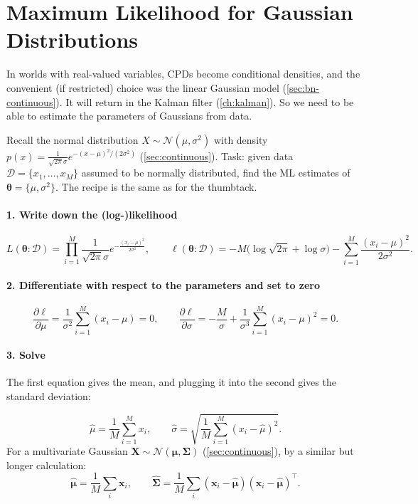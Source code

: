 \documentclass[11pt, oneside]{book}
\newcommand{\dataset}{\mathcal{D}}       %
\newcommand{\params}{\boldsymbol{\theta}}   %
\newcommand{\Normal}{\mathcal{N}}
\newcommand{\bX}{\mathbf{X}}  \newcommand{\bY}{\mathbf{Y}}
\newcommand{\bx}{\mathbf{x}}  \newcommand{\by}{\mathbf{y}}
\let\originalsection\section
\renewcommand{\section}{\Needspace{7\baselineskip}\originalsection}
\begin{document}
\section{Maximum Likelihood for Gaussian Distributions}
\label{sec:ml-gaussian}

In worlds with real-valued variables, CPDs become conditional densities, and
the convenient (if restricted) choice was the linear Gaussian model
(\cref{sec:bn-continuous}). It will return in the Kalman filter
(\cref{ch:kalman}). So we need to be able to estimate the parameters of
Gaussians from data.

Recall the normal distribution $X \sim \Normal(\mu, \sigma^2)$ with density
$p(x) = \frac{1}{\sqrt{2\pi}\sigma} e^{-(x-\mu)^2/(2\sigma^2)}$
(\cref{sec:continuous}). Task: given data $\dataset = \{x_1, \ldots, x_M\}$
assumed to be normally distributed, find the ML estimates of $\params = \{\mu,
\sigma^2\}$. The recipe is the same as for the thumbtack.

\paragraph{1. Write down the (log-)likelihood}
\[
L(\params : \dataset) = \prod_{i=1}^{M} \frac{1}{\sqrt{2\pi}\sigma} e^{-\frac{(x_i - \mu)^2}{2\sigma^2}},
\qquad
\ell(\params : \dataset) = -M\big(\log\sqrt{2\pi} + \log\sigma\big) - \sum_{i=1}^{M} \frac{(x_i - \mu)^2}{2\sigma^2}.
\]

\paragraph{2. Differentiate with respect to the parameters and set to zero}
\[
\frac{\partial \ell}{\partial \mu} = \frac{1}{\sigma^2}\sum_{i=1}^{M}(x_i - \mu) = 0,
\qquad
\frac{\partial \ell}{\partial \sigma} = -\frac{M}{\sigma} + \frac{1}{\sigma^3}\sum_{i=1}^{M}(x_i - \mu)^2 = 0.
\]

\paragraph{3. Solve} The first equation gives the mean, and plugging it into the
second gives the standard deviation:

\begin{thmbox}[title={ML estimates for a Gaussian}, unbreakable]
\[
\hat\mu = \frac{1}{M}\sum_{i=1}^{M} x_i, \qquad
\hat\sigma = \sqrt{\frac{1}{M}\sum_{i=1}^{M} (x_i - \hat\mu)^2}.
\]
For a multivariate Gaussian $\bX \sim \Normal(\bm{\mu}, \bm{\Sigma})$
(\cref{sec:continuous}), by a similar but longer calculation:
\[
\hat{\bm{\mu}} = \frac{1}{M}\sum_{i} \bx_i, \qquad
\hat{\bm{\Sigma}} = \frac{1}{M}\sum_{i} (\bx_i - \hat{\bm{\mu}})(\bx_i - \hat{\bm{\mu}})^\top.
\]
\end{thmbox}
\end{document}
